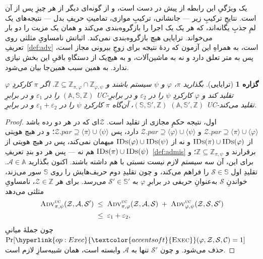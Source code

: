 \documentclass[10pt,oneside,openany]{book}
\newcommand{\pars}{\mathit{par}}
\newcommand{\Corr}{\mathcal{C}}
\newcommand{\Zenv}{\mathcal{Z}}
\newcommand{\Adv}{\mathcal{A}}
\newcommand{\Sim}{\mathcal{S}}
\newcommand{\advtg}{\op{Adv}}
\newcommand{\Aset}{\mathbb{A}}
\newcommand{\SimSet}{\mathbb{S}}
\newcommand{\ZenvSet}{\mathbb{Z}}
\newcommand{\op}[1]{\textnormal{\textsc{#1}}}
\newcommand{\opl}[1]{\hyperlink{op:#1}{\textcolor{accentsoft}{\op{#1}}}}
\newcommand{\IDs}{\op{IDs}}
\newcommand{\ncl}[1]{\langle #1 \rangle}
\theoremstyle{accentdef}
\theoremstyle{accentplain}
\newtheorem{proposition}[definition]{گزاره}
\begin{document}
یک ویژگیِ این رابطه از پیش در دست است، و از گونه‌ای دیگر از هر چیزِ پس از
آن است. نتایجِ ترکیبِ زیر --- جانشانی، ترکیبِ موازی، تمامیتِ حریفِ بدل ---
نتیجه‌های یک لمِ جذبِ یگانه‌اند، که هر یک یک اجرا را بازگروه‌بندی می‌کند
و همان یک مزیت را دو بار می‌خواند. ترایایی هیچ بازگروه‌بندی نمی‌کند.
اثباتش نامساویِ مثلثی روی تعریفِ~\ref{def:adv} است، به همراهِ این آزمون
که ردهٔ نتیجه برای زوجِ بیرونی مجاز است، پس به متر تعلق دارد و نه به
ماشین‌آلات، و به هیچ‌یک از دستگاهِ باقیِ این بخش نیازی ندارد. به همین سبب
همین‌جا بیان می‌شود.

\begin{proposition}[ترایایی]\label{prop:trans}
بگذارید $\pi$، $\varphi$ و $\psi$ سیستم باشند و $\ZenvSet \subseteq
\ZenvSet_{\pi,\varphi} \cap \ZenvSet_{\varphi,\psi}$. اگر $\pi$ کارکردِ
$\varphi$ را در $\varepsilon_1$ و در برابرِ $(\Aset,\SimSet,\ZenvSet)$
UC-تقلید کند و $\varphi$ کارکردِ $\psi$ را در $\varepsilon_2$ و در برابرِ
$(\SimSet,\SimSet',\ZenvSet)$، آن‌گاه $\pi$ کارکردِ $\psi$ را در
$\varepsilon_1 + \varepsilon_2$ و در برابرِ $(\Aset,\SimSet',\ZenvSet)$
UC-تقلید می‌کند.
\end{proposition}

\begin{proof}
اول، نتیجه حکمِ مجازی از تقلید است. $\Zenv$ای که در هر دو رده باشد
$\Zenv.\pars \supseteq \ncl{\pi} \cup \ncl{\varphi}$ و $\Zenv.\pars
\supseteq \ncl{\varphi} \cup \ncl{\psi}$ دارد، پس $\Zenv.\pars \supseteq
\ncl{\pi} \cup \ncl{\psi}$؛ و در هیچ هویتی از $\IDs(\pi) \cup
\IDs(\varphi)$ و نه از $\IDs(\varphi) \cup \IDs(\psi)$ میهمان نمی‌کند، پس
در هیچ هویتی از $\IDs(\pi) \cup \IDs(\psi)$ هم نه --- پس هر دو بندِ
تعریفِ~\ref{def:admis} برقرارند و $\ZenvSet \subseteq
\ZenvSet_{\pi,\psi}$؛ و برای این، آن سه سیستم لازم نیست نسبتی با هم
داشته باشند. اکنون بگذارید $\Adv \in \Aset$. تقلیدِ اول $\Sim \in
\SimSet$ را فراهم می‌کند، و چون تقلیدِ دوم حریف‌هایش را روی $\SimSet$ سور
می‌زند، خواندنِ $\Sim$ به‌عنوانِ حریفی در برابرِ $\varphi$ به $\Sim' \in
\SimSet'$ می‌رسد. برای هر $\Zenv \in \ZenvSet$، نامساویِ مثلثی می‌دهد
\[
  \begin{aligned}
  \advtg^{\op{uc}}_{\pi,\psi}(\Zenv,\Adv,\Sim')
  &\;\leq\;
  \advtg^{\op{uc}}_{\pi,\varphi}(\Zenv,\Adv,\Sim) \;+\; \advtg^{\op{uc}}_{\varphi,\psi}(\Zenv,\Sim,\Sim') \\
  &\;\leq\; \varepsilon_1 + \varepsilon_2 ,
  \end{aligned}
\]
چون جملهٔ میانیِ $\Pr[\opl{Exec}(\varphi,\Zenv,\Sim,\Corr) = 1]$ حذف
می‌شود. و چون $\Sim'$ تنها به $\Adv$ وابسته است، همان شبیه‌سازِ لازم است.
\end{proof}
\end{document}
